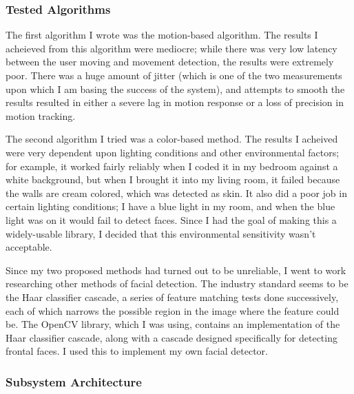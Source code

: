 \subsubsection{Tested Algorithms}
The first algorithm I wrote was the motion-based algorithm. The
results I acheieved from this algorithm were mediocre; while there was
very low latency between the user moving and movement detection, the
results were extremely poor. There was a huge amount of jitter (which
is one of the two measurements upon which I am basing the success of
the system), and attempts to smooth the results resulted in either a
severe lag in motion response or a loss of precision in motion
tracking. 

The second algorithm I tried was a color-based method. The results I
acheived were very dependent upon lighting conditions and other
environmental factors; for example, it worked fairly reliably when I
coded it in my bedroom against a white background, but when I brought
it into my living room, it failed because the walls are cream colored,
which was detected as skin. It also did a poor job in certain lighting
conditions; I have a blue light in my room, and when the blue light
was on it would fail to detect faces. Since I had the goal of making
this a widely-usable library, I decided that this environmental
sensitivity wasn't acceptable.

Since my two proposed methods had turned out to be unreliable, I went
to work researching other methods of facial detection. The industry
standard seems to be the Haar classifier cascade, a series of feature
matching tests done successively, each of which narrows the possible
region in the image where the feature could be. The OpenCV library,
which I was using, contains an implementation of the Haar classifier
cascade, along with a cascade designed specifically for detecting
frontal faces. I used this to implement my own facial detector.

\subsubsection{Subsystem Architecture}

